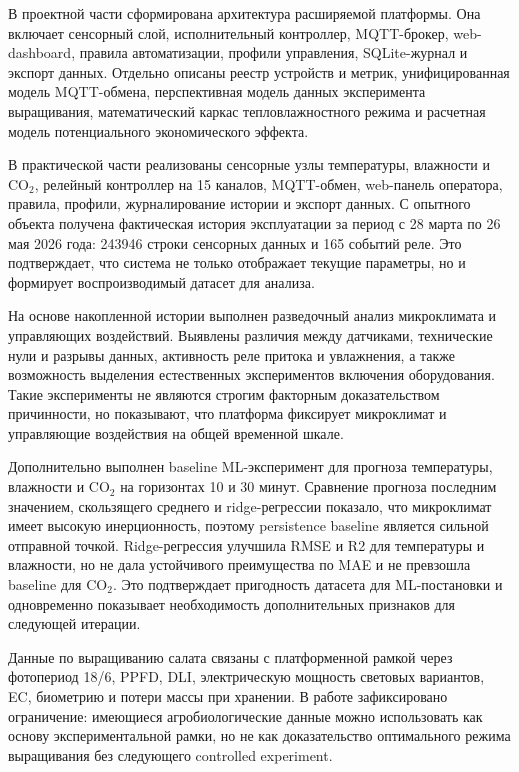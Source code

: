 \documentclass[a4paper,14pt]{extarticle}
\begin{document}
В проектной части сформирована архитектура расширяемой платформы. Она
включает сенсорный слой, исполнительный контроллер, MQTT-брокер,
web-dashboard, правила автоматизации, профили управления, SQLite-журнал
и экспорт данных. Отдельно описаны реестр устройств и метрик,
унифицированная модель MQTT-обмена, перспективная модель данных
эксперимента выращивания, математический каркас тепловлажностного режима
и расчетная модель потенциального экономического эффекта.

В практической части реализованы сенсорные узлы температуры, влажности и
CO\(_2\), релейный контроллер на 15 каналов, MQTT-обмен, web-панель
оператора, правила, профили, журналирование истории и экспорт данных. С
опытного объекта получена фактическая история эксплуатации за период с
28 марта по 26 мая 2026 года: 243946 строки сенсорных данных и 165
событий реле. Это подтверждает, что система не только отображает текущие
параметры, но и формирует воспроизводимый датасет для анализа.

На основе накопленной истории выполнен разведочный анализ микроклимата и
управляющих воздействий. Выявлены различия между датчиками, технические
нули и разрывы данных, активность реле притока и увлажнения, а также
возможность выделения естественных экспериментов включения оборудования.
Такие эксперименты не являются строгим факторным доказательством
причинности, но показывают, что платформа фиксирует микроклимат и
управляющие воздействия на общей временной шкале.

Дополнительно выполнен baseline ML-эксперимент для прогноза температуры,
влажности и CO\(_2\) на горизонтах 10 и 30 минут. Сравнение прогноза
последним значением, скользящего среднего и ridge-регрессии показало,
что микроклимат имеет высокую инерционность, поэтому persistence
baseline является сильной отправной точкой. Ridge-регрессия улучшила
RMSE и R2 для температуры и влажности, но не дала устойчивого
преимущества по MAE и не превзошла baseline для CO\(_2\). Это
подтверждает пригодность датасета для ML-постановки и одновременно
показывает необходимость дополнительных признаков для следующей
итерации.

Данные по выращиванию салата связаны с платформенной рамкой через
фотопериод 18/6, PPFD, DLI, электрическую мощность световых вариантов,
EC, биометрию и потери массы при хранении. В работе зафиксировано
ограничение: имеющиеся агробиологические данные можно использовать как
основу экспериментальной рамки, но не как доказательство оптимального
режима выращивания без следующего controlled experiment.
\end{document}
